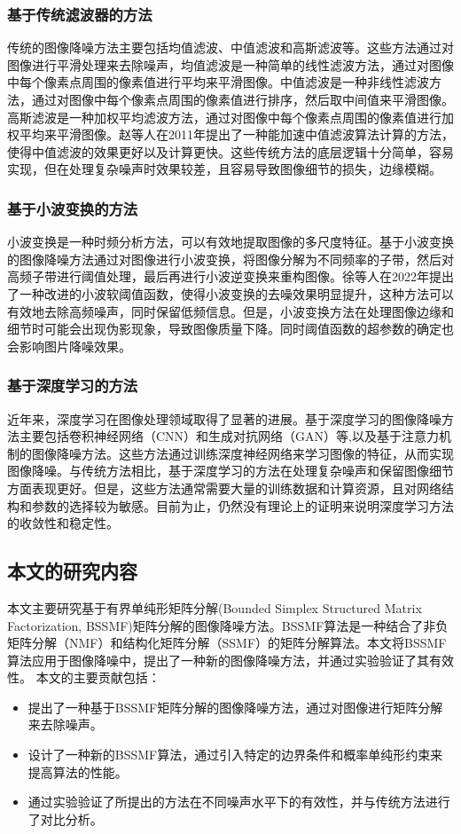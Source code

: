 \documentclass[12pt]{article}
\begin{document}
\subsubsection{基于传统滤波器的方法}
传统的图像降噪方法主要包括均值滤波、中值滤波和高斯滤波等。这些方法通过对图像进行平滑处理来去除噪声，均值滤波是一种简单的线性滤波方法，通过对图像中每个像素点周围的像素值进行平均来平滑图像。中值滤波是一种非线性滤波方法，通过对图像中每个像素点周围的像素值进行排序，然后取中间值来平滑图像。高斯滤波是一种加权平均滤波方法，通过对图像中每个像素点周围的像素值进行加权平均来平滑图像。赵等人在2011年提出了一种能加速中值滤波算法计算的方法，使得中值滤波的效果更好以及计算更快\cite{中值滤波}。这些传统方法的底层逻辑十分简单，容易实现，但在处理复杂噪声时效果较差，且容易导致图像细节的损失，边缘模糊。

\subsubsection{基于小波变换的方法}
小波变换是一种时频分析方法，可以有效地提取图像的多尺度特征。基于小波变换的图像降噪方法通过对图像进行小波变换，将图像分解为不同频率的子带，然后对高频子带进行阈值处理，最后再进行小波逆变换来重构图像。徐等人在2022年提出了一种改进的小波软阈值函数\cite{小波变换}，使得小波变换的去噪效果明显提升，这种方法可以有效地去除高频噪声，同时保留低频信息。但是，小波变换方法在处理图像边缘和细节时可能会出现伪影现象，导致图像质量下降。同时阈值函数的超参数的确定也会影响图片降噪效果。

\subsubsection{基于深度学习的方法}
近年来，深度学习在图像处理领域取得了显著的进展。基于深度学习的图像降噪方法主要包括卷积神经网络（CNN）和生成对抗网络（GAN）等\cite{深度学习去噪},以及基于注意力机制的图像降噪方法\cite{注意力机制}。这些方法通过训练深度神经网络来学习图像的特征，从而实现图像降噪。与传统方法相比，基于深度学习的方法在处理复杂噪声和保留图像细节方面表现更好。但是，这些方法通常需要大量的训练数据和计算资源，且对网络结构和参数的选择较为敏感。目前为止，仍然没有理论上的证明来说明深度学习方法的收敛性和稳定性。

\subsection{本文的研究内容}
本文主要研究基于有界单纯形矩阵分解(Bounded Simplex Structured Matrix Factorization, BSSMF)矩阵分解的图像降噪方法。BSSMF算法是一种结合了非负矩阵分解（NMF）和结构化矩阵分解（SSMF）的矩阵分解算法。本文将BSSMF算法应用于图像降噪中，提出了一种新的图像降噪方法，并通过实验验证了其有效性。
本文的主要贡献包括：
\begin{itemize}
    \item 提出了一种基于BSSMF矩阵分解的图像降噪方法，通过对图像进行矩阵分解来去除噪声。
    \item 设计了一种新的BSSMF算法，通过引入特定的边界条件和概率单纯形约束来提高算法的性能。
    \item 通过实验验证了所提出的方法在不同噪声水平下的有效性，并与传统方法进行了对比分析。
\end{itemize}
\end{document}
